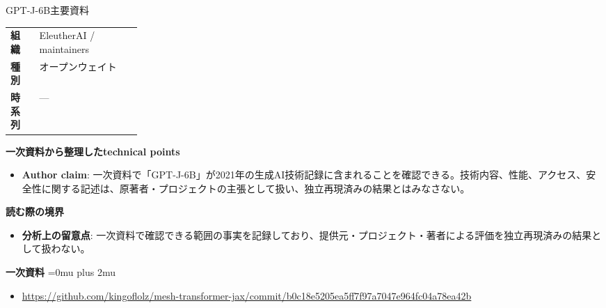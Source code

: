 \begin{technicalnote}{GPT-J-6B}{主要資料}
\begingroup
\begin{tabularx}{\linewidth}{@{}>{\bfseries}p{0.22\linewidth}X@{}}
組織 & EleutherAI / maintainers \\
種別 & オープンウェイト \\
時系列 & — \\
\end{tabularx}
\smallskip
{\bfseries 一次資料から整理したtechnical points}
\begin{itemize}[leftmargin=1.5em,itemsep=0.35em]
\item \textbf{Author claim}: 一次資料で「GPT-J-6B」が2021年の生成AI技術記録に含まれることを確認できる。技術内容、性能、アクセス、安全性に関する記述は、原著者・プロジェクトの主張として扱い、独立再現済みの結果とはみなさない。
\end{itemize}
\begin{minipage}{\linewidth}
{\bfseries 読む際の境界}
\begin{itemize}[leftmargin=1.5em,itemsep=0.35em]
\item \textbf{分析上の留意点}: 一次資料で確認できる範囲の事実を記録しており、提供元・プロジェクト・著者による評価を独立再現済みの結果として扱わない。
\end{itemize}
\begin{samepage}
{\bfseries 一次資料}
\begingroup\sloppy
\Urlmuskip=0mu plus 2mu\relax
\begin{itemize}[leftmargin=1.5em,itemsep=0.25em]
\item {\scriptsize\url{https://github.com/kingoflolz/mesh-transformer-jax/commit/b0c18e5205ea5ff7f97a7047e964fc04a78ea42b}}
\end{itemize}
\endgroup
\end{samepage}
\end{minipage}
\endgroup
\end{technicalnote}
\medskip

